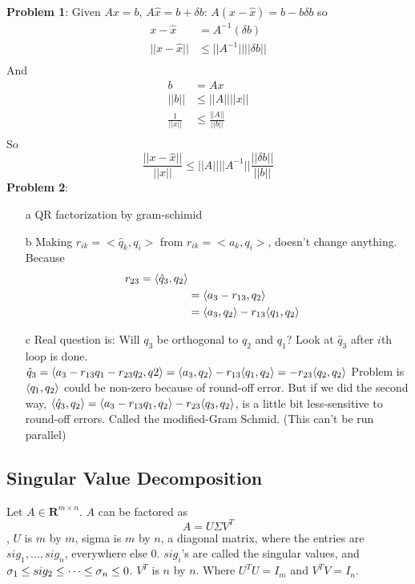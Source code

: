 \textbf{Problem 1}:
Given $Ax=b$, $A\hat x = b + \delta b$: $A(x-\hat x) = b -b \delta b$
so 
\begin{align*}
x-\hat x &= A^{-1}(\delta b)\\
||x-\hat x|| &\le ||A^{-1}||||\delta b||\\
\end{align*}
And
\begin{align*}
  b&=Ax\\
||b|| &\le ||A|| ||x||\\
\frac{1}{||x||} &\le \frac{||A||}{||b||}\\
\end{align*}
So
$$
\frac{||x-\hat x||}{||x||} \le ||A|| ||A^{-1}|| \frac{||\delta b||}{||b||}
$$
\noi
\textbf{Problem 2}: 
\begin{enumerate}
\item[a] QR factorization by gram-schimid
\item[b] Making $r_{ik} = <\hat q_k, q_i>$ from $r_{ik} =<a_k, q_i>$,
  doesn't change anything. Because
  \begin{align*}
    r_{23} = \langle\hat q_3, q_2\rangle \\
&= \langle a_3 - r_{13}, q_2\rangle\\
&= \langle a_3, q_2 \rangle - r_{13}\langle q_1, q_2 \rangle
\end{align*}
\item[c] Real question is: Will $q_3$ be orthogonal to $q_2$ and
  $q_1$? Look at $\hat q_3$ after $i$th loop is done. $\hat q_3 = \langle
  a_3 - r_{13}q_1 - r_{23}q_2, q2 \rangle = \langle a_3, q_2\rangle - r_{13}\langle
  q_1, q_2\rangle = -r_{23}\langle q_2, q_2 \rangle$
Problem is $\langle q_1, q_2\rangle$ could be non-zero because of round-off
error.
But if we did the second way, $\langle \hat q_3, q_2 \rangle = \langle a_3 - r_{13}q_1, q_2 \rangle -
r_{23}\langle q_3, q_2 \rangle$, is a little bit less-sensitive to round-off
errors. Called the modified-Gram Schmid. (This can't be run parallel)
\end{enumerate}

\subsection{Singular Value Decomposition}
\label{sec:SVD}

Let $A\in \mathbf{R}^{m\times n}$. $A$ can be factored as $$A=U\Sigma
V^T$$, $U$ is $m$ by $m$, sigma is $m$ by $n$, a diagonal matrix, where
the entries are $sig_1, \dots, sig_n$, everywhere else 0. $sig_i$'s
are called the singular values, and $\sigma_1 \le sig_2 \le \cdots \le
\sigma_n \le 0$.
$V^T$ is $n$ by $n$. Where $U^TU = I_m$ and $V^TV = I_n$.

